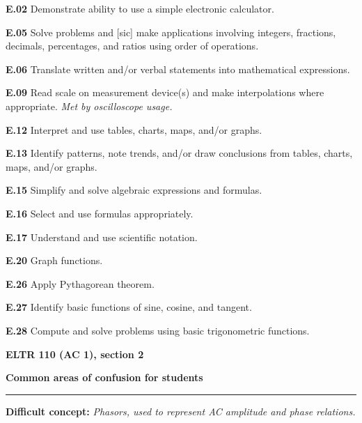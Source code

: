 \item{\bf E.02} Demonstrate ability to use a simple electronic calculator.
\item{\bf E.05} Solve problems and [sic] make applications involving integers, fractions, decimals, percentages, and ratios using order of operations.
\item{\bf E.06} Translate written and/or verbal statements into mathematical expressions.
\item{\bf E.09} Read scale on measurement device(s) and make interpolations where appropriate.  {\it Met by oscilloscope usage.}
\item{\bf E.12} Interpret and use tables, charts, maps, and/or graphs.
\item{\bf E.13} Identify patterns, note trends, and/or draw conclusions from tables, charts, maps, and/or graphs.
\item{\bf E.15} Simplify and solve algebraic expressions and formulas.
\item{\bf E.16} Select and use formulas appropriately.
\item{\bf E.17} Understand and use scientific notation.
\item{\bf E.20} Graph functions.
\item{\bf E.26} Apply Pythagorean theorem.
\item{\bf E.27} Identify basic functions of sine, cosine, and tangent.
\item{\bf E.28} Compute and solve problems using basic trigonometric functions.
\medskip





\vfil \eject

\centerline{\bf ELTR 110 (AC 1), section 2} \bigskip 
 
\vskip 10pt

\noindent
{\bf Common areas of confusion for students}

\vskip 5pt

\hrule \vskip 5pt

\vskip 10pt

\noindent
{\bf Difficult concept: } {\it Phasors, used to represent AC amplitude and phase relations.}

